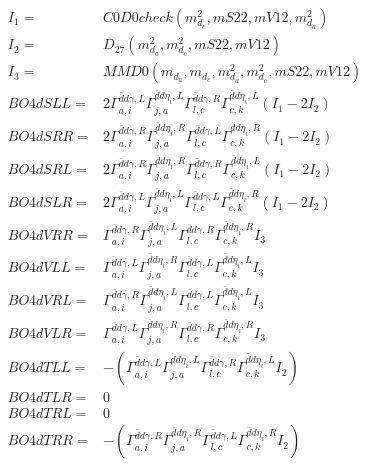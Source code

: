 \documentclass[A4,landscape]{article}
\begin{document}
\begin{align} 
I_1 = & C0D0check(m^2_{d_{{c}}}, mS22, mV12, m^2_{d_{{a}}}) \\ 
I_2 = & D_{27}(m^2_{d_{{a}}}, m^2_{d_{{c}}}, mS22, mV12) \\ 
I_3 = & MMD0(m_{d_{{a}}}, m_{d_{{c}}}, m^2_{d_{{a}}}, m^2_{d_{{c}}}, mS22, mV12) \\ 
  BO4dSLL= & 2  \Gamma^{\bar{d}d \gamma ,L}_{a, i} \Gamma^{\bar{d}d \eta_i ,L}_{j, a} \Gamma^{\bar{d}d \gamma ,R}_{l, c} \Gamma^{\bar{d}d \eta_i ,L}_{c, k} (I_1 - 2 I_2) \\ 
  BO4dSRR= & 2  \Gamma^{\bar{d}d \gamma ,R}_{a, i} \Gamma^{\bar{d}d \eta_i ,R}_{j, a} \Gamma^{\bar{d}d \gamma ,L}_{l, c} \Gamma^{\bar{d}d \eta_i ,R}_{c, k} (I_1 - 2 I_2) \\ 
  BO4dSRL= & 2  \Gamma^{\bar{d}d \gamma ,R}_{a, i} \Gamma^{\bar{d}d \eta_i ,R}_{j, a} \Gamma^{\bar{d}d \gamma ,R}_{l, c} \Gamma^{\bar{d}d \eta_i ,L}_{c, k} (I_1 - 2 I_2) \\ 
  BO4dSLR= & 2  \Gamma^{\bar{d}d \gamma ,L}_{a, i} \Gamma^{\bar{d}d \eta_i ,L}_{j, a} \Gamma^{\bar{d}d \gamma ,L}_{l, c} \Gamma^{\bar{d}d \eta_i ,R}_{c, k} (I_1 - 2 I_2) \\ 
  BO4dVRR= &  \Gamma^{\bar{d}d \gamma ,R}_{a, i} \Gamma^{\bar{d}d \eta_i ,L}_{j, a} \Gamma^{\bar{d}d \gamma ,R}_{l, c} \Gamma^{\bar{d}d \eta_i ,R}_{c, k} I_3 \\ 
  BO4dVLL= &  \Gamma^{\bar{d}d \gamma ,L}_{a, i} \Gamma^{\bar{d}d \eta_i ,R}_{j, a} \Gamma^{\bar{d}d \gamma ,L}_{l, c} \Gamma^{\bar{d}d \eta_i ,L}_{c, k} I_3 \\ 
  BO4dVRL= &  \Gamma^{\bar{d}d \gamma ,R}_{a, i} \Gamma^{\bar{d}d \eta_i ,L}_{j, a} \Gamma^{\bar{d}d \gamma ,L}_{l, c} \Gamma^{\bar{d}d \eta_i ,L}_{c, k} I_3 \\ 
  BO4dVLR= &  \Gamma^{\bar{d}d \gamma ,L}_{a, i} \Gamma^{\bar{d}d \eta_i ,R}_{j, a} \Gamma^{\bar{d}d \gamma ,R}_{l, c} \Gamma^{\bar{d}d \eta_i ,R}_{c, k} I_3 \\ 
  BO4dTLL= & -( \Gamma^{\bar{d}d \gamma ,L}_{a, i} \Gamma^{\bar{d}d \eta_i ,L}_{j, a} \Gamma^{\bar{d}d \gamma ,R}_{l, c} \Gamma^{\bar{d}d \eta_i ,L}_{c, k} I_2) \\ 
  BO4dTLR= & 0 \\ 
  BO4dTRL= & 0 \\ 
  BO4dTRR= & -( \Gamma^{\bar{d}d \gamma ,R}_{a, i} \Gamma^{\bar{d}d \eta_i ,R}_{j, a} \Gamma^{\bar{d}d \gamma ,L}_{l, c} \Gamma^{\bar{d}d \eta_i ,R}_{c, k} I_2) \\ 
\end{align} 
\end{document}
